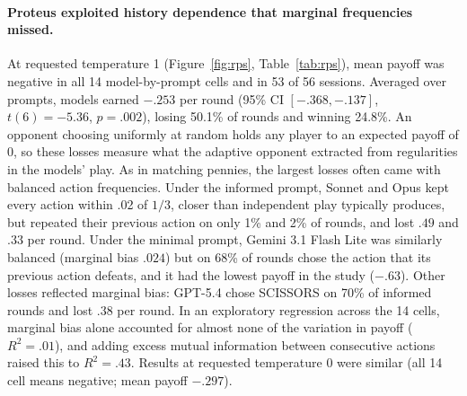 \paragraph{Proteus exploited history dependence that marginal frequencies missed.} At requested temperature 1 (Figure~\ref{fig:rps}, Table~\ref{tab:rps}), mean payoff was negative in all 14 model-by-prompt cells and in 53 of 56 sessions. Averaged over prompts, models earned $-.253$ per round (95\% CI $[-.368, -.137]$, $t(6) = -5.36$, $p = .002$), losing 50.1\% of rounds and winning 24.8\%. An opponent choosing uniformly at random holds any player to an expected payoff of 0, so these losses measure what the adaptive opponent extracted from regularities in the models' play. As in matching pennies, the largest losses often came with balanced action frequencies. Under the informed prompt, Sonnet and Opus kept every action within .02 of $1/3$, closer than independent play typically produces, but repeated their previous action on only 1\% and 2\% of rounds, and lost $.49$ and $.33$ per round. Under the minimal prompt, Gemini 3.1 Flash Lite was similarly balanced (marginal bias $.024$) but on 68\% of rounds chose the action that its previous action defeats, and it had the lowest payoff in the study ($-.63$). Other losses reflected marginal bias: GPT-5.4 chose SCISSORS on 70\% of informed rounds and lost $.38$ per round. In an exploratory regression across the 14 cells, marginal bias alone accounted for almost none of the variation in payoff ($R^2 = .01$), and adding excess mutual information between consecutive actions raised this to $R^2 = .43$. Results at requested temperature 0 were similar (all 14 cell means negative; mean payoff $-.297$).


